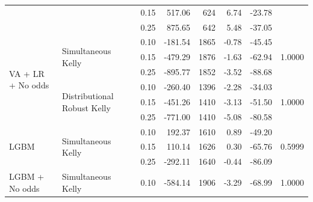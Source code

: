 \documentclass[12pt,twoside]{report}
\begin{document}
\begin{table}[!htb]
{\begin{tabular}{llrrrrrr}
                                     &                                              & 0.15     & 517.06      & 624        & 6.74       & -23.78   &                          \\
                                     &                                              & 0.25     & 875.65      & 642        & 5.48       & -37.05   &                          \\ 
\midrule
\multirow{6}{*}{VA + LR + No odds}   & \multirow{3}{*}{Simultaneous Kelly}          & 0.10     & -181.54     & 1865       & -0.78      & -45.45   & \multirow{3}{*}{1.0000}  \\
                                     &                                              & 0.15     & -479.29     & 1876       & -1.63      & -62.94   &                          \\
                                     &                                              & 0.25     & -895.77     & 1852       & -3.52      & -88.68   &                          \\ 
\cmidrule{2-8}
                                     & \multirow{3}{*}{Distributional Robust Kelly} & 0.10     & -260.40     & 1396       & -2.28      & -34.03   & \multirow{3}{*}{1.0000}  \\
                                     &                                              & 0.15     & -451.26     & 1410       & -3.13      & -51.50   &                          \\
                                     &                                              & 0.25     & -771.00     & 1410       & -5.08      & -80.58   &                          \\ 
\midrule
\multirow{3}{*}{LGBM}                & \multirow{3}{*}{Simultaneous Kelly}          & 0.10     & 192.37      & 1610       & 0.89       & -49.20   & \multirow{3}{*}{0.5999}  \\
                                     &                                              & 0.15     & 110.14      & 1626       & 0.30       & -65.76   &                          \\
                                     &                                              & 0.25     & -292.11     & 1640       & -0.44      & -86.09   &                          \\ 
\midrule
\multirow{3}{*}{LGBM + No odds}      & \multirow{3}{*}{Simultaneous Kelly}          & 0.10     & -584.14     & 1906       & -3.29      & -68.99   & \multirow{3}{*}{1.0000}  \\

\end{tabular}}
\end{table}
\end{document}
